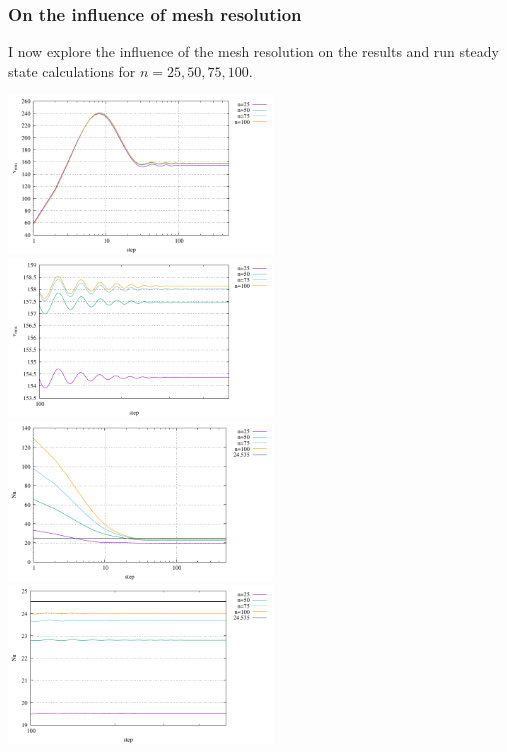 \subsubsection*{On the influence of mesh resolution} 

I now explore the influence of the mesh resolution on the results and run steady state 
calculations for $n=25,50,75,100$.

\begin{center}
\includegraphics[width=7cm]{python_codes/fieldstone_51/images/vrms_res.pdf}
\includegraphics[width=7cm]{python_codes/fieldstone_51/images/vrms_res_zoom.pdf}\\
\includegraphics[width=7cm]{python_codes/fieldstone_51/images/Nu_res.pdf}
\includegraphics[width=7cm]{python_codes/fieldstone_51/images/Nu_res_zoom.pdf}\\

\end{center}
